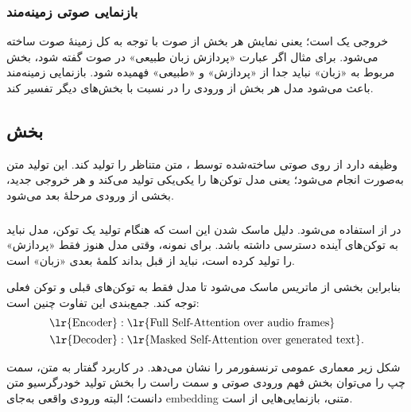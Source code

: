 \subsubsection{بازنمایی صوتی زمینه‌مند}
خروجی  یک  است؛ یعنی نمایش هر بخش از صوت با توجه به کل زمینهٔ صوت ساخته می‌شود. برای مثال اگر عبارت «پردازش زبان طبیعی» در صوت گفته شود، بخش مربوط به «زبان» نباید جدا از «پردازش» و «طبیعی» فهمیده شود. بازنمایی زمینه‌مند باعث می‌شود مدل هر بخش از ورودی را در نسبت با بخش‌های دیگر تفسیر کند.

\subsection{بخش }
 وظیفه دارد از روی  صوتی ساخته‌شده توسط ، متن متناظر را تولید کند. این تولید متن به‌صورت  انجام می‌شود؛ یعنی مدل توکن‌ها را یکی‌یکی تولید می‌کند و هر خروجی جدید، بخشی از ورودی مرحلهٔ بعد می‌شود.

\subsubsection{}
در  از  استفاده می‌شود. دلیل ماسک شدن این است که هنگام تولید یک توکن، مدل نباید به توکن‌های آینده دسترسی داشته باشد. برای نمونه، وقتی مدل هنوز فقط «پردازش» را تولید کرده است، نباید از قبل بداند کلمهٔ بعدی «زبان» است.

بنابراین بخشی از ماتریس  ماسک می‌شود تا مدل فقط به توکن‌های قبلی و توکن فعلی توجه کند. جمع‌بندی این تفاوت چنین است:
\[
\begin{aligned}
\text{\lr{Encoder}} &: \text{\lr{Full Self-Attention over audio frames}}\\
\text{\lr{Decoder}} &: \text{\lr{Masked Self-Attention over generated text}}.
\end{aligned}
\]

شکل زیر معماری عمومی ترنسفورمر  را نشان می‌دهد. در کاربرد گفتار به متن، سمت چپ را می‌توان بخش فهم ورودی صوتی و سمت راست را بخش تولید خودرگرسیو متن دانست؛ البته ورودی واقعی  به‌جای embedding متنی، بازنمایی‌هایی از  است.


